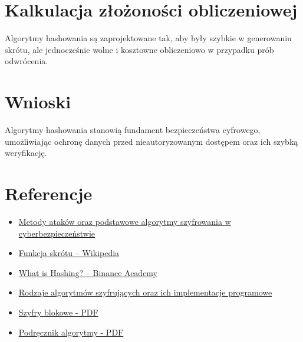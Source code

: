 \documentclass[12pt]{article}
\begin{document}
\section*{Kalkulacja złożoności obliczeniowej}
Algorytmy hashowania są zaprojektowane tak, aby były szybkie w generowaniu skrótu, ale jednocześnie wolne i kosztowne obliczeniowo w przypadku prób odwrócenia.

\section*{Wnioski}
Algorytmy hashowania stanowią fundament bezpieczeństwa cyfrowego, umożliwiając ochronę danych przed nieautoryzowanym dostępem oraz ich szybką weryfikację.

\section*{Referencje}
\begin{itemize}
    \item \href{https://sii.pl/blog/metody-atakow-oraz-podstawowe-algorytmy-szyfrowania-w-cyberbezpieczenstwie/}{Metody ataków oraz podstawowe algorytmy szyfrowania w cyberbezpieczeństwie}
    \item \href{https://pl.wikipedia.org/wiki/Funkcja_skr%C3%B3tu}{Funkcja skrótu – Wikipedia}
    \item \href{https://academy.binance.com/pl/articles/what-is-hashing}{What is Hashing? – Binance Academy}
    \item \href{https://klinikadanych.pl/artykuly/rodzaje-algorytmow-szyfrujacych-oraz-ich-implementacje-programowe}{Rodzaje algorytmów szyfrujących oraz ich implementacje programowe}
    \item \href{https://ssamolej.kia.prz.edu.pl/dydaktyka/KiBD/03_KiBD_szyfry_blokowe.pdf}{Szyfry blokowe - PDF}
    \item \href{https://informatyka.2ap.pl/ftp/3d/algorytmy/podr%C4%99cznik_algorytmy.pdf}{Podręcznik algorytmy - PDF}
\end{itemize}
\end{document}
